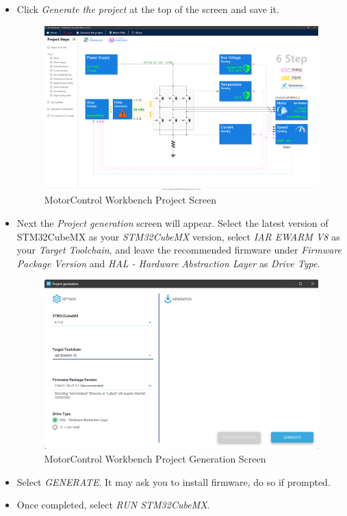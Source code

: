 \documentclass[10pt]{article}
\begin{document}
\begin{itemize}
\begin{figure}[H]
                    \end{figure}
                \item Click \emph{Generate the project} at the top of the screen and save it.
                    \begin{figure}[H]
                        \centerline{\includegraphics[width=\textwidth]{References/MCW Project Screen.png}}
                        \caption{MotorControl Workbench Project Screen}
                    \end{figure}
                \item Next the \emph{Project generation} screen will appear. Select the latest version of STM32CubeMX as your \emph{STM32CubeMX} version, select \emph{IAR EWARM V8} as your \emph{Target Toolchain}, and leave the recommended firmware under \emph{Firmware Package Version} and \emph{HAL - Hardware Abstraction Layer} as \emph{Drive Type}.
                    \begin{figure}[H]
                        \centerline{\includegraphics[width=\textwidth]{References/MCW Project Gen.png}}
                        \caption{MotorControl Workbench Project Generation Screen}
                    \end{figure}
                \item Select \emph{GENERATE}. It may ask you to install firmware, do so if prompted.
                \item Once completed, select \emph{RUN STM32CubeMX}.
            \end{itemize}
\end{document}
